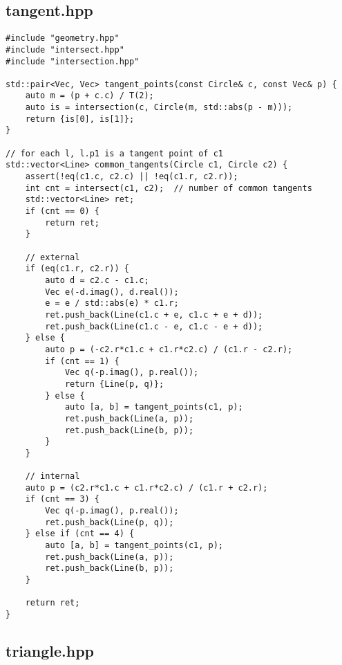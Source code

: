 \subsection{tangent.hpp}

\begin{small}
\begin{markdown}

\end{markdown}
\end{small}

\begin{lstlisting}
#include "geometry.hpp"
#include "intersect.hpp"
#include "intersection.hpp"

std::pair<Vec, Vec> tangent_points(const Circle& c, const Vec& p) {
    auto m = (p + c.c) / T(2);
    auto is = intersection(c, Circle(m, std::abs(p - m)));
    return {is[0], is[1]};
}

// for each l, l.p1 is a tangent point of c1
std::vector<Line> common_tangents(Circle c1, Circle c2) {
    assert(!eq(c1.c, c2.c) || !eq(c1.r, c2.r));
    int cnt = intersect(c1, c2);  // number of common tangents
    std::vector<Line> ret;
    if (cnt == 0) {
        return ret;
    }

    // external
    if (eq(c1.r, c2.r)) {
        auto d = c2.c - c1.c;
        Vec e(-d.imag(), d.real());
        e = e / std::abs(e) * c1.r;
        ret.push_back(Line(c1.c + e, c1.c + e + d));
        ret.push_back(Line(c1.c - e, c1.c - e + d));
    } else {
        auto p = (-c2.r*c1.c + c1.r*c2.c) / (c1.r - c2.r);
        if (cnt == 1) {
            Vec q(-p.imag(), p.real());
            return {Line(p, q)};
        } else {
            auto [a, b] = tangent_points(c1, p);
            ret.push_back(Line(a, p));
            ret.push_back(Line(b, p));
        }
    }

    // internal
    auto p = (c2.r*c1.c + c1.r*c2.c) / (c1.r + c2.r);
    if (cnt == 3) {
        Vec q(-p.imag(), p.real());
        ret.push_back(Line(p, q));
    } else if (cnt == 4) {
        auto [a, b] = tangent_points(c1, p);
        ret.push_back(Line(a, p));
        ret.push_back(Line(b, p));
    }

    return ret;
}

\end{lstlisting}

\subsection{triangle.hpp}

